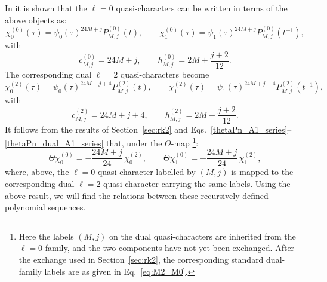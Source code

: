 \documentclass[11pt]{article}
\begin{document}
In \cite{Chandra:2018pjq} it is shown that the $\ell=0$ quasi-characters can be written in terms of the above objects as:
\begin{equation}
    \chi^{(0)}_{0}(\tau)
    =
    \psi_0(\tau)^{24M+j}
    P^{(0)}_{M,j}(t),
    \qquad
    \chi^{(0)}_{1}(\tau)
    =
    \psi_1(\tau)^{24M+j}
    P^{(0)}_{M,j}(t^{-1}),
    \label{thetaPn_A1_series}
\end{equation}
with
\begin{equation}
    c^{(0)}_{M,j}
    =
    24M+j,
    \qquad
    h^{(0)}_{M,j}
    =
    2M+\frac{j+2}{12}.
    \label{thetaPn_A1_ch}
\end{equation}
The corresponding dual $\ell=2$ quasi-characters become
\begin{equation}
    \chi^{(2)}_{0}(\tau)
    =
    \psi_0(\tau)^{24M+j+4}
    P^{(2)}_{M,j}(t),
    \qquad
    \chi^{(2)}_{1}(\tau)
    =
    \psi_1(\tau)^{24M+j+4}
    P^{(2)}_{M,j}(t^{-1}),
    \label{thetaPn_dual_A1_series}
\end{equation}
with
\begin{equation}
    c^{(2)}_{M,j}
    =
    24M+j+4,
    \qquad
    h^{(2)}_{M,j}
    =
    2M+\frac{j+2}{12}.
    \label{thetaPn_dual_A1_ch}
\end{equation}
It follows from the results of Section~\ref{sec:rk2} and
Eqs.~\eqref{thetaPn_A1_series}--\eqref{thetaPn_dual_A1_series} that, under the \(\Theta\)-map \footnote{Here the labels \((M,j)\) on the dual quasi-characters are inherited from the \(\ell=0\) family, and the two components have not yet been exchanged. After the exchange used in Section~\ref{sec:rk2}, the corresponding standard dual-family labels are as given in Eq.~\eqref{eq:M2_M0}.}:
\begin{equation}
    \Theta\chi^{(0)}_{0}
    =
    -\frac{24M+j}{24}\,
    \chi^{(2)}_{0},
    \qquad
    \Theta\chi^{(0)}_{1}
    =
    -\frac{24M+j}{24}\,
    \chi^{(2)}_{1},
    \label{thetaPn_main_map}
\end{equation}
where, above, the $\ell=0$ quasi-character labelled by $(M,j)$ is mapped
to the corresponding dual $\ell=2$ quasi-character carrying the
same labels. Using the above result, we will find the relations between these recursively defined polynomial sequences.
\end{document}
